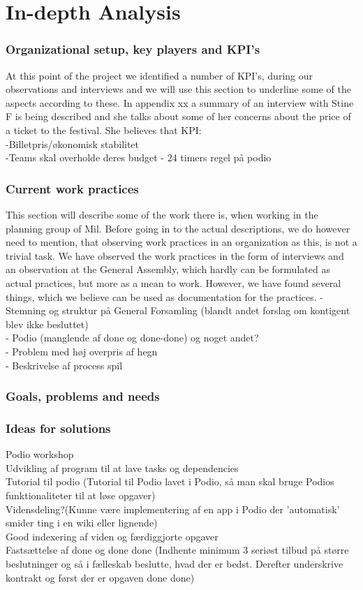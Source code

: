 \part{In-depth Analysis}

\section{Organizational setup, key players and KPI's}
At this point of the project we identified a number of KPI's, during our observations and interviews and we will use this section to underline some of the aspects according to these.
In appendix xx a summary of an interview with Stine F is being described and she talks about some of her concerns about the price of a ticket to the festival. She believes that 
KPI:\\
-Billetpris/økonomisk stabilitet\\
-Teams skal overholde deres budget
- 24 timers regel på podio
\section{Current work practices}
This section will describe some of the work there is, when working in the planning group of Mil. Before going in to the actual descriptions, we do however need to mention, that observing work practices in an organization as this, is not a trivial task. We have observed the work practices in the form of interviews and an observation at the General Assembly, which hardly can be formulated as actual practices, but more as a mean to work. However, we have found several things, which we believe can be used as documentation for the practices. 
- Stemning og struktur på General Forsamling (blandt andet forslag om kontigent blev ikke besluttet)\\
- Podio (manglende af done og done-done) og noget andet?\\
- Problem med høj overpris af hegn\\
- Beskrivelse af process spil

\section{Goals, problems and needs}

\section{Ideas for solutions}
Podio workshop\\
Udvikling af program til at lave tasks og dependencies\\
Tutorial til podio (Tutorial til Podio lavet i Podio, så man skal bruge Podios funktionaliteter til at løse opgaver)\\
Vidensdeling?(Kunne være implementering af en app i Podio der 'automatisk' smider ting i en wiki eller lignende)\\
Good indexering af viden og færdiggjorte opgaver\\
Fastsættelse af done og done done (Indhente minimum 3 seriøst tilbud på større beslutninger og så i fælleskab beslutte, hvad der er bedst. Derefter underskrive kontrakt
og først der er opgaven done done)


